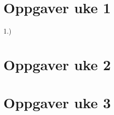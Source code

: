 \documentclass[12pt]{article}
\begin{document}
 

\section{Oppgaver uke 1}
1.)

\section{Oppgaver uke 2}

\section{Oppgaver uke 3}

% 
%
%
\end{document}
